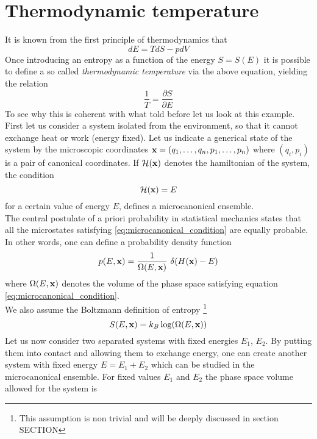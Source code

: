 \section{Thermodynamic temperature}
It is known from the first principle of thermodynamics that 
\begin{equation*}
    dE = TdS - pdV
\end{equation*}
Once introducing an entropy as a function of the energy $S = S(E)$ it is possible to define a so called \emph{thermodynamic temperature} via the above equation, yielding the relation $$\frac{1}{T} = \frac{\partial S}{\partial E}$$
To see why this is coherent with what told before let us look at this example. \\
First let us consider a system isolated from the environment, so that it cannot exchange heat or work (energy fixed). Let us indicate a generical
state of the system by the microscopic coordinates $\mathbf{x} = (q_1, \dots, q_n, p_1, \dots, p_n)$ where $(q_i, p_i)$ is a pair of canonical coordinates. If $\mathcal{H}(\mathbf{x})$ denotes the hamiltonian of the system,
the condition
\begin{equation}
    \mathcal{H}(\mathbf{x}) = E
    \label{eq:microcanonical_condition}
\end{equation}    
for a certain value of energy $E$, defines a microcanonical ensemble. \\
The central postulate of a priori probability in statistical mechanics states that all the microstates satisfying \ref{eq:microcanonical_condition} are equally probable. In other words, one can
define a probability density function
\begin{equation*}
    p(E, \mathbf{x}) = \frac{1}{\Omega(E, \mathbf{x})} \ \delta(H(\mathbf{x}) - E)
\end{equation*}
where $\Omega(E, \mathbf{x})$ denotes the volume of the phase space satisfying equation \ref{eq:microcanonical_condition}. \\
We also assume the Boltzmann definition of entropy \footnote{This assumption is non trivial and will be deeply discussed in section SECTION}
\begin{equation}
    S(E, \mathbf{x}) = k_B \log(\Omega(E, \mathbf{x}))
    \label{eq:Boltzmann_entropy}
\end{equation}
Let us now consider two separated systems with fixed energies $E_1$, $E_2$. By putting them into contact and allowing them to exchange energy, one can create another system 
with fixed energy $E = E_1 + E_2$ which can be studied in the microcanonical ensemble.
For fixed values $E_1$ and $E_2$ the phase space volume allowed for the system is 
